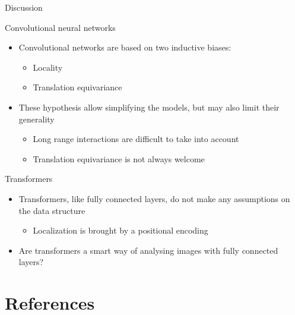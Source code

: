 \documentclass[xcolor=pdftex,dvipsnames,table,mathserif]{beamer}
\begin{document}
\begin{frame}{Discussion}

  \begin{block}{Convolutional neural networks}

    \begin{itemize}[<+->]
    \item Convolutional networks are based on two inductive biases:
      \begin{itemize}
      \item Locality
      \item Translation equivariance
      \end{itemize}

    \item These hypothesis allow simplifying the models, but may also limit their generality

      \begin{itemize}
      \item Long range interactions are difficult to take into account
      \item Translation equivariance is not always welcome

      \end{itemize}
    \end{itemize}

  \end{block}

  \begin{block}{Transformers}

    \begin{itemize}[<+->]
    \item Transformers, like fully connected layers, do not make any assumptions on the data structure
      \begin{itemize}
      \item Localization is brought by a positional encoding
      \end{itemize}

    \item Are transformers a smart way of analysing images with fully connected layers?

    \end{itemize}
  \end{block}


\end{frame}



\section*{References}


\end{document}
